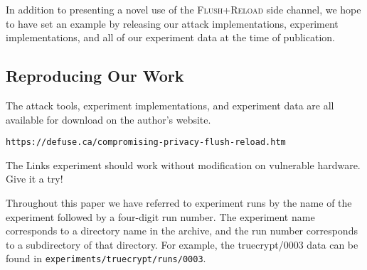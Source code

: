 \documentclass[letterpaper,twocolumn,10pt]{article}
\begin{document}
In addition to presenting a novel use of the \textsc{Flush+Reload} side channel,
we hope to have set an example by releasing our attack implementations,
experiment implementations, and all of our experiment data at the time of
publication.

{\footnotesize 
}

\theendnotes

\begin{appendices}
    \section{Reproducing Our Work}
    \label{sec:reproducing}

    The attack tools, experiment implementations, and experiment data are all
    available for download on the author's website.

    \texttt{https://defuse.ca/compromising-privacy-flush-reload.htm}

%
%
    The Links experiment should work without modification on vulnerable
    hardware. Give it a try!

    Throughout this paper we have referred to experiment runs by the name of the
    experiment followed by a four-digit run number. The experiment name
    corresponds to a directory name in the archive, and the run number
    corresponds to a subdirectory of that directory. For example, the
    truecrypt/0003 data can be found in
    \texttt{experiments/truecrypt/runs/0003}.
\end{appendices}
\end{document}
